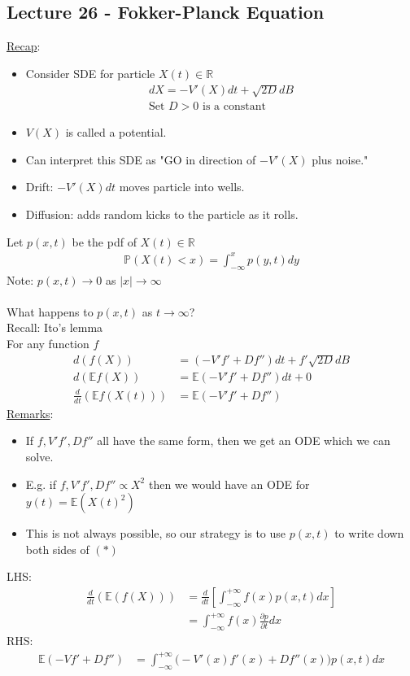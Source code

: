 \documentclass[12pt, letterpaper]{article}
\begin{document}
\subsection{Lecture 26 - Fokker-Planck Equation}
\underline{Recap}:
\begin{itemize}
    \item Consider SDE for particle $X(t) \in \mathbb{R}$
    \begin{align*}
        dX = -V'(X)dt + \sqrt{2D}dB \\
        \text{Set } D>0 \text{ is a constant} 
    \end{align*}
    \item $V(X)$ is called a potential.
    \item Can interpret this SDE as "GO in direction of $-V'(X)$ plus noise."
    \item Drift: $-V'(X)dt$ moves particle into wells.
    \item Diffusion: adds random kicks to the particle as it rolls.
\end{itemize}
Let $p(x,t)$ be the pdf of $X(t) \in \mathbb{R}$
\begin{align*}
    \mathbb{P}(X(t) < x) = \int_{-\infty}^{x} p(y,t)dy
\end{align*}
Note: $p(x,t) \rightarrow 0$ as $|x|\rightarrow \infty$  \\ \\ 
What happens to $p(x,t)$ as $t\rightarrow \infty$? \\
Recall: Ito's lemma \\

For any function $f$
\begin{align*}
    d(f(X)) &= \left( -V'f' + Df'' \right)dt + f'\sqrt{2D}dB \\
    d(\mathbb{E}f(X)) &= \mathbb{E} (-V'f' + Df'')dt + 0 \\
    \frac{d}{dt} (\mathbb{E}f(X(t))) &=  \mathbb{E}(-V'f' + Df'') \tag{$\ast$}
\end{align*}
\underline{Remarks}:
\begin{itemize}
    \item If $f,V'f',Df''$ all have the same form, then we get an ODE which 
    we can solve.
    \item E.g. if $f,V'f',Df'' \propto X^2$ then we would have an ODE for 
    $y(t) = \mathbb{E}(X(t)^2)$
    \item This is not always possible, so our strategy is to use $p(x,t)$ to 
    write down both sides of $(\ast)$
\end{itemize}
LHS: 
\begin{align*}
    \frac{d}{dt}(\mathbb{E}(f(X))) &= \frac{d}{dt} \left[ \int_{-\infty}^{+\infty} f(x)p(x,t)dx \right] \\
    &= \int_{-\infty}^{+\infty} f(x)\frac{\partial p}{\partial t} dx
\end{align*}
RHS:
\begin{align*}
    \mathbb{E}(-Vf'+Df'') &= \int_{-\infty}^{+\infty} \big(-V'(x)f'(x) + Df''(x)\big)p(x,t)dx
\end{align*}
\end{document}
